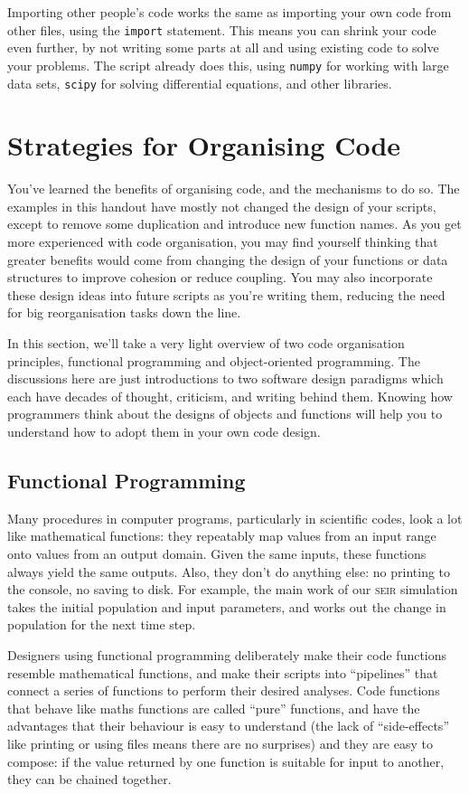 \documentclass[a4paper]{article}
\begin{document}
Importing other people's code works the same as importing your own code from other files, using the \texttt{import} statement. This means you can shrink your code even further, by not writing some parts at all and using existing code to solve your problems. The script already does this, using \texttt{numpy} for working with large data sets, \texttt{scipy} for solving differential equations, and other libraries.

\section{Strategies for Organising Code}
You've learned the benefits of organising code, and the mechanisms to do so. The examples in this handout have mostly not changed the design of your scripts, except to remove some duplication and introduce new function names. As you get more experienced with code organisation, you may find yourself thinking that greater benefits would come from changing the design of your functions or data structures to improve cohesion or reduce coupling. You may also incorporate these design ideas into future scripts as you're writing them, reducing the need for big reorganisation tasks down the line.

In this section, we'll take a very light overview of two code organisation principles, functional programming and object-oriented programming. The discussions here are just introductions to two software design paradigms which each have decades of thought, criticism, and writing behind them. Knowing how programmers think about the designs of objects and functions will help you to understand how to adopt them in your own code design.

\subsection{Functional Programming}
Many procedures in computer programs, particularly in scientific codes, look a lot like mathematical functions: they repeatably map values from an input range onto values from an output domain. Given the same inputs, these functions always yield the same outputs. Also, they don't do anything else: no printing to the console, no saving to disk. For example, the main work of our \textsc{seir} simulation takes the initial population and input parameters, and works out the change in population for the next time step.

Designers using functional programming deliberately make their code functions resemble mathematical functions, and make their scripts into ``pipelines'' that connect a series of functions to perform their desired analyses. Code functions that behave like maths functions are called ``pure'' functions, and have the advantages that their behaviour is easy to understand (the lack of ``side-effects'' like printing or using files means there are no surprises) and they are easy to compose: if the value returned by one function is suitable for input to another, they can be chained together.
\end{document}
